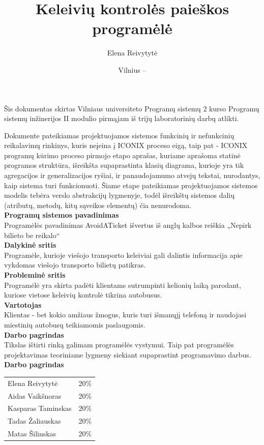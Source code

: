 \documentclass{VUMIFPSkursinis}
\title{Keleivių kontrolės paieškos programėlė}
\author{Elena Reivytytė}
\date{Vilnius – \the\year}
\begin{document}
\maketitle

Šis dokumentas skirtas Vilniaus universiteto Programų sistemų 2 kurso Programų sistemų inžinerijos II modulio pirmąjam iš trijų laboratorinių darbų atlikti.
\tableofcontents

Dokumente pateikiamas projektuojamos sistemos funkcinių ir nefunkcinių reikalavimų rinkinys, kuris neįeina į ICONIX proceso eigą, taip pat - ICONIX programų kūrimo proceso pirmojo etapo aprašas, kuriame aprašoma statinė programos struktūra, išreikšta supaprastinta klasių diagrama, kurioje yra tik agregacijos ir generalizacijos ryšiai, ir panaudojamumo atvejų tekstai, nurodantys, kaip sistema turi funkcionuoti. Šiame etape pateikiamas projektuojamos sistemos modelis tebėra verslo abstrakcijų lygmenyje, todėl išreikštų sistemos dalių (atributų, metodų, kitų sąveikos elementų) čia nenurodoma.\\

\noindent
\textbf{Programų sistemos pavadinimas}\\
Programėlės pavadinimas AvoidATicket išvertus iš anglų kalbos reiškia „Nepirk bilieto be reikalo“\\
\textbf{Dalykinė sritis}\\
Programėle, kurioje viešojo transporto keleiviai gali dalintis informacija apie vykdomas viešojo transporto bilietų patikras.\\
\textbf{Probleminė sritis}\\
Programėlė yra skirta padėti klientams sutrumpinti kelionių laiką parodant, kuriose vietose keleivių kontrolė tikrina autobusus.\\
\textbf{Vartotojas}\\
Klientas - bet kokio amžiaus žmogus, kuris turi išmanųjį telefoną ir naudojasi miestinių autobusų teikiamomis paslaugomis.\\
\textbf{Darbo pagrindas}\\
Tikslas ištirti rinką galimam programėlės vystymui. Taip pat programėlės projektavimas teoriniame lygmeny siekiant supaprastint programavimo darbus.\\
\textbf{Darbo pagrindas}\\
\begin{tabular}{lr}
   Elena Reivytytė & 20\% \\
   Aidas Vaikšnoras & 20\% \\
   Kasparas Taminskas & 20\% \\
   Tadas Žaliauskas & 20\% \\
   Matas Šilinskas & 20\% \\
\end{tabular}
\end{document}

